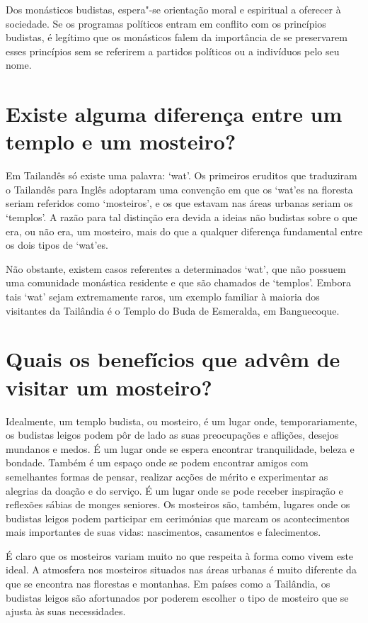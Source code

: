Dos monásticos budistas, espera"-se orientação moral e espiritual a
oferecer à sociedade. Se os programas políticos entram em conflito com
os princípios budistas, é legítimo que os monásticos falem da importância
de se preservarem esses princípios sem se referirem a partidos
políticos ou a indivíduos pelo seu nome.

\section{Existe alguma diferença entre um templo e um mosteiro?}

Em Tailandês só existe uma palavra: `wat'. Os primeiros eruditos que
traduziram o Tailandês para Inglês adoptaram uma convenção em que os
`wat'es na floresta seriam referidos como `mosteiros', e os que
estavam nas áreas urbanas seriam os `templos'. A razão para tal
distinção era devida a ideias não budistas sobre o que era, ou não era,
um mosteiro, mais do que a qualquer diferença fundamental entre os dois
tipos de `wat'es.

Não obstante, existem casos referentes a determinados `wat', que não
possuem uma comunidade monástica residente e que são chamados de
`templos'. Embora tais `wat' sejam extremamente raros, um exemplo
familiar à maioria dos visitantes da Tailândia é o Templo do Buda de
Esmeralda, em Banguecoque.

\section{Quais os benefícios que advêm de visitar um mosteiro?}

Idealmente, um templo budista, ou mosteiro, é um lugar onde,
temporariamente, os budistas leigos podem pôr de lado as suas
preocupações e aflições, desejos mundanos e medos. É um lugar onde se
espera encontrar tranquilidade, beleza e bondade. Também é um espaço
onde se podem encontrar amigos com semelhantes formas de pensar,
realizar acções de mérito e experimentar as alegrias da doação e do
serviço. É um lugar onde se pode receber inspiração e reflexões sábias
de monges seniores. Os mosteiros são, também, lugares onde os budistas
leigos podem participar em cerimónias que marcam os acontecimentos mais
importantes de suas vidas: nascimentos, casamentos e falecimentos.

É claro que os mosteiros variam muito no que respeita à forma como
vivem este ideal. A atmosfera nos mosteiros situados nas áreas urbanas é
muito diferente da que se encontra nas florestas e montanhas. Em países
como a Tailândia, os budistas leigos são afortunados por poderem
escolher o tipo de mosteiro que se ajusta às suas necessidades.


